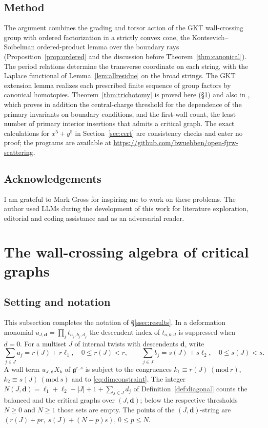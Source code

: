 \documentclass[11pt]{amsart}
\theoremstyle{definition}
\theoremstyle{remark}
\newcommand{\gfrak}{\mathfrak{g}}
\begin{document}
\subsection{Method}
The argument combines the grading and torsor action of the GKT wall-crossing
group with ordered factorization in a strictly convex cone, the
Kontsevich--Soibelman ordered-product lemma over the boundary rays (Proposition~\ref{prop:ordered} and the discussion before
Theorem~\ref{thm:canonical}).  The period
relations determine the transverse coordinate on each string, with the
Laplace functional of Lemma~\ref{lem:allresidue} on the broad strings.  The
GKT extension lemma realizes each prescribed finite
sequence of group factors by canonical homotopies.
Theorem~\ref{thm:trichotomy} is proved here (\S\ref{sec:algebra}) and also in
\cite{note}, which proves in addition the central-charge threshold for the
dependence of the primary invariants on boundary conditions, and the
first-wall count, the least number of primary interior insertions that admits
a critical graph.  The exact calculations for $x^5+y^5$ in
Section~\ref{sec:cert} are consistency checks and enter no proof; the programs are available at
\url{https://github.com/bwuebben/open-fjrw-scattering}.

\subsection*{Acknowledgements}
I am grateful to Mark Gross for inspiring me to work on these problems.
The author used LLMs during the development of this work for literature exploration, editorial and coding assistance and as an adversarial reader.

\section{The wall-crossing algebra of critical graphs}
\label{sec:algebra}

\subsection{Setting and notation}
\label{ssec:setting}
This subsection completes the notation of \S\ref{ssec:results}.  In a
deformation monomial $u_{J,\mathbf d}=\prod_{j}t_{a_{j},b_{j},d_{j}}$ the
descendent index of $t_{a,b,d}$ is suppressed when $d=0$.  For a multiset $J$
of internal twists with descendents $\mathbf d$, write
\[
 \sum_{j\in J}a_j=r(J)+r\ell_1,\quad 0\le r(J)<r,\qquad
 \sum_{j\in J}b_j=s(J)+s\ell_2,\quad 0\le s(J)<s.
\]
A wall term $u_{J,\mathbf d}X_{k}$ of $\gfrak^{r,s}$ is subject to the
congruences $k_{1}\equiv r(J)\ (\mathrm{mod}\ r)$,
$k_{2}\equiv s(J)\ (\mathrm{mod}\ s)$ and to \eqref{eq:dimconstraint}.  The
integer $N(J,\mathbf d)=\ell_1+\ell_2-|J|+1+\sum_{j\in J}d_j$ of
Definition~\ref{def:diagonal} counts the balanced and the critical graphs over
$(J,\mathbf d)$; below the respective thresholds $N\ge0$ and $N\ge1$ those
sets are empty.  The points of the $(J,\mathbf d)$-string are
$(r(J)+pr,\ s(J)+(N-p)s)$, $0\le p\le N$.
\end{document}

